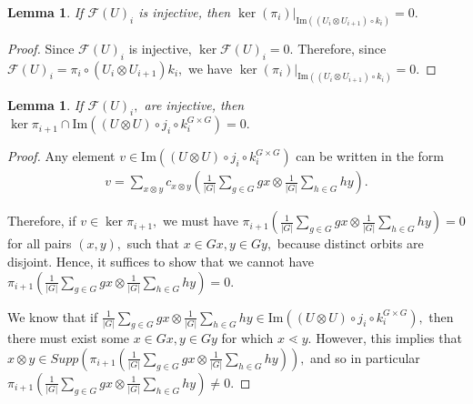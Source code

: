 \documentclass{amsart}
\newtheorem{lem}[subsubsection]{Lemma}
\newcommand\im{\text{Im}}
\begin{document}
\begin{lem}
If $\mathcal F(U)_i$ is injective, then $\ker(\pi_i)|_{\im((U_i \otimes U_{i+1})\circ k_i)}=0.$
\end{lem}
\begin{proof}
Since $\mathcal F(U)_i$ is injective, $\ker \mathcal F(U)_i  = 0.$ Therefore, since $\mathcal F(U)_i = \pi_i \circ (U_i\otimes U_{i+1}) k_i,$ we have $\ker(\pi_i)|_{\im((U_i \otimes U_{i+1})\circ k_i)}=0.$
\end{proof}

\begin{lem}
\label{no_pi_kernel}
If $\mathcal F(U)_i,$ are injective, then $\ker \pi_{i+1} \cap \im((U\otimes U)\circ j_i\circ k^{G\times G}_i)=0.$
\end{lem}
\begin{proof}
Any element $v \in \im((U\otimes U)\circ j_i\circ k^{G\times G}_i)$ can be written in the form 
\begin{align*}
	v=\sum_{x\otimes y}^{}c_{x\otimes y}\left(\frac{1}{|G|}\sum_{g \in G}^{} gx\otimes \frac{1}{|G|}\sum_{h\in G}^{}hy\right).
\end{align*}

Therefore, if $v \in \ker \pi_{i+1},$ we must have $\pi_{i+1}\left(\frac{1}{|G|}\sum_{g \in G}^{} gx\otimes \frac{1}{|G|}\sum_{h\in G}^{}hy\right) = 0$ for all pairs $(x,y),$ such that $x \in Gx,y \in Gy,$ because distinct orbits are disjoint. Hence, it suffices to show that we cannot have $\pi_{i+1}\left(\frac{1}{|G|}\sum_{g \in G}^{} gx\otimes \frac{1}{|G|}\sum_{h\in G}^{}hy\right) = 0.$

We know that if $\frac{1}{|G|}\sum_{g \in G}^{} gx\otimes \frac{1}{|G|}\sum_{h\in G}^{}hy \in \im((U\otimes U)\circ j_i\circ k^{G\times G}_i),$ then there must exist some $x \in Gx,y \in Gy$ for which $x \lessdot y.$ However, this implies that $x \otimes y \in Supp\left(\pi_{i+1}\left(\frac{1}{|G|}\sum_{g \in G}^{} gx\otimes \frac{1}{|G|}\sum_{h\in G}^{}hy\right)\right),$ and so in particular $\pi_{i+1}\left(\frac{1}{|G|}\sum_{g \in G}^{} gx\otimes \frac{1}{|G|}\sum_{h\in G}^{}hy\right) \neq 0.$
\end{proof}
\end{document}
